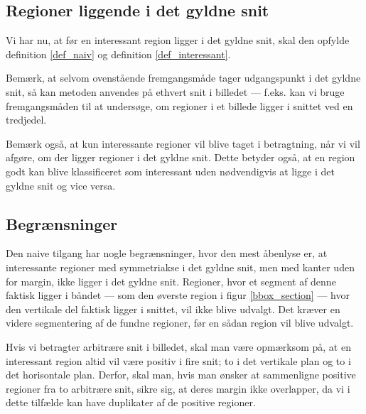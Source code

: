 {\subsection{Regioner liggende i det gyldne snit}
Vi har nu, at før en interessant region ligger i det gyldne snit,
skal den opfylde definition \ref{def_naiv} og definition
\ref{def_interessant}.

Bemærk, at selvom ovenstående fremgangsmåde tager udgangspunkt i det
gyldne snit, så kan metoden anvendes på ethvert snit i billedet ---
f.eks. kan vi bruge fremgangsmåden til at undersøge, om regioner i et
billede ligger i snittet ved en tredjedel.

Bemærk også, at kun interessante regioner vil blive taget i betragtning, når
vi vil afgøre, om der ligger regioner i det gyldne snit. Dette betyder
også, at en region godt kan blive klassificeret som interessant uden
nødvendigvis at ligge i det gyldne snit og vice versa.

\subsection{Begrænsninger}
Den naive tilgang har nogle begrænsninger, hvor den mest åbenlyse er, at
interessante regioner med symmetriakse i det gyldne snit, men med kanter
uden for margin, ikke ligger i det gyldne snit.  Regioner, hvor et
segment af denne faktisk ligger i båndet --- som den øverste region i
figur \ref{bbox_section} --- hvor den vertikale del faktisk ligger i
snittet, vil ikke blive udvalgt.  Det kræver en videre segmentering af
de fundne regioner, før en sådan region vil blive udvalgt.

Hvis vi betragter arbitrære snit i billedet, skal man være opmærksom på,
at en interessant region altid vil være positiv i fire snit; to i det
vertikale plan og to i det horisontale plan. Derfor, skal man, hvis man
ønsker at sammenligne positive regioner fra to arbitrære snit, sikre
sig, at deres margin ikke overlapper, da vi i dette tilfælde kan have
duplikater af de positive regioner.

}

